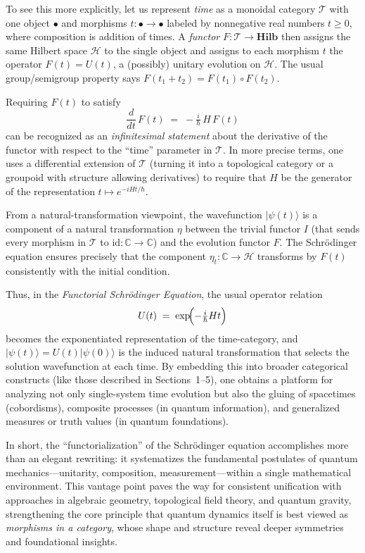 \documentclass[12pt]{article}
\begin{document}
To see this more explicitly, let us represent \emph{time} as a monoidal category $\mathcal{T}$ with one object $\bullet$ and morphisms $t:\bullet\to\bullet$ labeled by nonnegative real numbers $t\ge 0$, where composition is addition of times.  A \emph{functor} $F:\mathcal{T}\to \mathbf{Hilb}$ then assigns the same Hilbert space $\mathcal{H}$ to the single object and assigns to each morphism $t$ the operator $F(t)=U(t)$, a (possibly) unitary evolution on $\mathcal{H}$.  The usual group/semigroup property says $F(t_1+t_2)=F(t_1)\circ F(t_2)$.

Requiring $F(t)$ to satisfy
\[
   \frac{d}{dt}\, F(t) \;=\; -\tfrac{i}{\hbar}\,H\,F(t)
\]
can be recognized as an \emph{infinitesimal statement} about the derivative of the functor with respect to the ``time'' parameter in $\mathcal{T}$.  In more precise terms, one uses a differential extension of $\mathcal{T}$ (turning it into a topological category or a groupoid with structure allowing derivatives) to require that $H$ be the generator of the representation $t\mapsto e^{-iHt/\hbar}$.  

From a natural-transformation viewpoint, the wavefunction $\lvert\psi(t)\rangle$ is a component of a natural transformation $\eta$ between the trivial functor $I$ (that sends every morphism in $\mathcal{T}$ to $\mathrm{id}:\mathbb{C}\to\mathbb{C}$) and the evolution functor $F$.  The Schrödinger equation ensures precisely that the component $\eta_t:\mathbb{C}\to \mathcal{H}$ transforms by $F(t)$ consistently with the initial condition.  

Thus, in the \emph{Functorial Schrödinger Equation}, the usual operator relation 
\[
   U(t)\;=\;\exp\!\Bigl(-\tfrac{i}{\hbar}Ht\Bigr)
\]
becomes the exponentiated representation of the time-category, and $\lvert\psi(t)\rangle=U(t)\lvert\psi(0)\rangle$ is the induced natural transformation that selects the solution wavefunction at each time.  By embedding this into broader categorical constructs (like those described in Sections~1--5), one obtains a platform for analyzing not only single-system time evolution but also the gluing of spacetimes (cobordisms), composite processes (in quantum information), and generalized measures or truth values (in quantum foundations).  

In short, the ``functorialization'' of the Schrödinger equation accomplishes more than an elegant rewriting: it systematizes the fundamental postulates of quantum mechanics---unitarity, composition, measurement---within a single mathematical environment.  This vantage point paves the way for consistent unification with approaches in algebraic geometry, topological field theory, and quantum gravity, strengthening the core principle that quantum dynamics itself is best viewed as \emph{morphisms in a category}, whose shape and structure reveal deeper symmetries and foundational insights.
\end{document}
